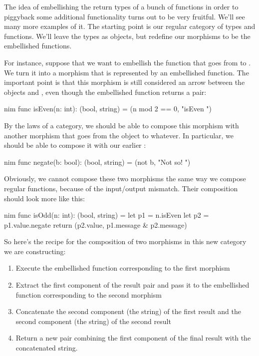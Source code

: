 The idea of embellishing the return types of a bunch of functions in
order to piggyback some additional functionality turns out to be very
fruitful. We'll see many more examples of it. The starting point is our
regular category of types and functions. We'll leave the types as
objects, but redefine our morphisms to be the embellished functions.

For instance, suppose that we want to embellish the function
 that goes from  to . We turn it
into a morphism that is represented by an embellished function. The
important point is that this morphism is still considered an arrow
between the objects  and , even though the
embellished function returns a pair:

\begin{snip}{nim}
func isEven(n: int): (bool, string) = (n mod 2 == 0,  "isEven ")
\end{snip}
By the laws of a category, we should be able to compose this morphism
with another morphism that goes from the object  to
whatever. In particular, we should be able to compose it with our
earlier :

\begin{snip}{nim}
func negate(b: bool): (bool, string) = (not b, "Not so! ")
\end{snip}
Obviously, we cannot compose these two morphisms the same way we compose
regular functions, because of the input/output mismatch. Their
composition should look more like this:

\begin{snip}{nim}
func isOdd(n: int): (bool, string) =
  let p1 = n.isEven
  let p2 = p1.value.negate
  return (p2.value, p1.message & p2.message)
\end{snip}
So here's the recipe for the composition of two morphisms in this new
category we are constructing:

\begin{enumerate}
  \tightlist
  \item
        Execute the embellished function corresponding to the first morphism
  \item
        Extract the first component of the result pair and pass it to the
        embellished function corresponding to the second morphism
  \item
        Concatenate the second component (the string) of the first result
        and the second component (the string) of the second result
  \item
        Return a new pair combining the first component of the final result
        with the concatenated string.
\end{enumerate}

